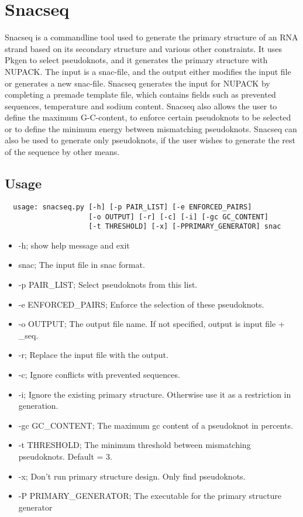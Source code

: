 \section{Snacseq}
Snacseq is a commandline tool used to generate the primary structure of an RNA strand based on its secondary structure and various other constraints. It uses Pkgen to select pseudoknots, and it generates the primary structure with NUPACK. The input is a snac-file, and the output either modifies the input file or generates a new snac-file. Snacseq generates the input for NUPACK by completing a premade template file, which contains fields such as prevented sequences, temperature and sodium content. Snacseq also allows the user to define the maximum G-C-content, to enforce certain pseudoknots to be selected or to define the minimum energy between mismatching pseudoknots. Snacseq can also be used to generate only pseudoknots, if the user wishes to generate the rest of the sequence by other means.
\subsection{Usage}
\begin{verbatim}
  usage: snacseq.py [-h] [-p PAIR_LIST] [-e ENFORCED_PAIRS]
                    [-o OUTPUT] [-r] [-c] [-i] [-gc GC_CONTENT]
                    [-t THRESHOLD] [-x] [-PPRIMARY_GENERATOR] snac
\end{verbatim}
\begin{itemize}
  \item -h; show help message and exit
  \item snac; The input file in snac format.
  \item -p PAIR\_LIST; Select pseudoknots from this list.
  \item -e ENFORCED\_PAIRS; Enforce the selection of these pseudoknots.
  \item -o OUTPUT; The output file name. If not specified, output is input file + \_seq.
  \item -r; Replace the input file with the output.
  \item -c; Ignore conflicts with prevented sequences.
  \item -i; Ignore the existing primary structure. Otherwise use it as a restriction in generation.
  \item -gc GC\_CONTENT; The maximum gc content of a pseudoknot in percents.
  \item -t THRESHOLD; The minimum threshold between mismatching pseudoknots. Default = 3.
  \item -x; Don't run primary structure design. Only find pseudoknots.
  \item -P PRIMARY\_GENERATOR; The executable for the primary structure generator
\end{itemize}

